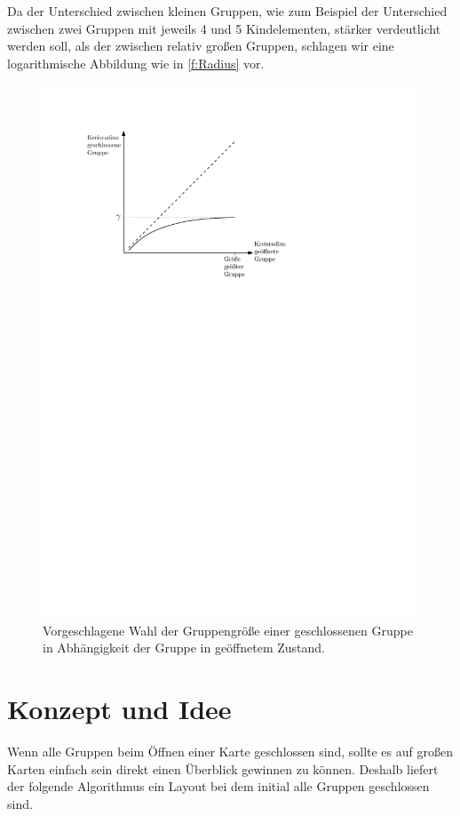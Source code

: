 Da der Unterschied zwischen kleinen Gruppen, wie zum Beispiel der Unterschied zwischen zwei Gruppen mit jeweils 4 und 5 Kindelementen, stärker verdeutlicht werden soll, als der zwischen 
relativ großen Gruppen, schlagen wir eine logarithmische Abbildung wie in \autoref{f:Radius} vor.
\begin{figure}[h!]
\begin{center} 
\includegraphics{Pics/Radius.pdf}
  \caption{Vorgeschlagene Wahl der Gruppengröße einer geschlossenen Gruppe in Abhängigkeit der Gruppe in geöffnetem Zustand. }
  \label{f:Radius}
\end{center}
\end{figure}


\section{Konzept und Idee}
\label{sec:Algo}
Wenn alle Gruppen beim Öffnen einer Karte geschlossen sind, sollte es auf großen Karten einfach sein direkt einen Überblick gewinnen zu können.
Deshalb liefert der folgende Algorithmus ein Layout bei dem initial alle Gruppen geschlossen sind.

